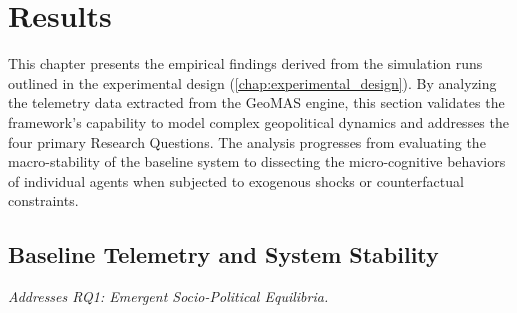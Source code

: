 \chapter{Results}
\label{chap:results}

This chapter presents the empirical findings derived from the simulation runs outlined in the experimental design (\ref{chap:experimental_design}). By analyzing the telemetry data extracted from the GeoMAS engine, this section validates the framework's capability to model complex geopolitical dynamics and addresses the four primary Research Questions. The analysis progresses from evaluating the macro-stability of the baseline system to dissecting the micro-cognitive behaviors of individual agents when subjected to exogenous shocks or counterfactual constraints.

%
%
%
%

\section{Baseline Telemetry and System Stability}
\label{sec:res_baseline}
\textit{Addresses RQ1: Emergent Socio-Political Equilibria.}

